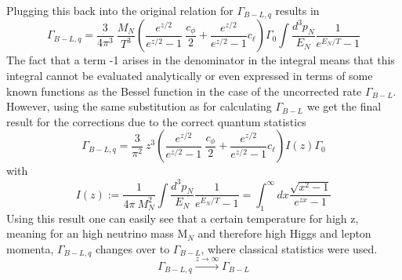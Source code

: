 Plugging this back into the original relation for $\Gamma_{B-L,q}$ results in
\begin{equation*}
\Gamma_{B-L,q}=\frac{3}{4\pi^3}\:\frac{M_N}{T^3}\left(\frac{e^{z/2}}{e^{z/2}-1}\:\frac{c_\phi}{2}+\frac{e^{z/2}}{e^{z/2}-1}c_\ell\right)\Gamma_0\int \frac{d^3p_N}{E_N}\frac{1}{e^{E_N/T}-1}
\end{equation*}
The fact that a term -1 arises in the denominator in the integral means that this integral cannot be evaluated analytically or even expressed in terms of some known functions as the Bessel function in the case of the uncorrected rate $\Gamma_{B-L}$. However, using the same substitution as for calculating $\Gamma_{B-L}$ we get the final result for the corrections due to the correct quantum statistics
\begin{equation*}
	\Gamma_{B-L,q}=\frac{3}{\pi^2}\:z^3\left(\frac{e^{z/2}}{e^{z/2}-1}\:\frac{c_\phi}{2}+\frac{e^{z/2}}{e^{z/2}-1}c_\ell\right)I(z)\Gamma_0
\end{equation*}
with 
\begin{equation*}
	I(z):=\frac{1}{4\pi\: M_N^2}\int \frac{d^3p_N}{E_N}\frac{1}{e^{E_N/T}-1}=\int_{1}^{\infty}dx\frac{\sqrt{x^2-1}}{e^{zx}-1}
\end{equation*}
Using this result one can easily see that a certain temperature for high z, meaning for an high neutrino mass M$_N$ and therefore high Higgs and lepton momenta, $\Gamma_{B-L,q}$ changes over to $\Gamma_{B-L}$, where classical statistics were used.
\begin{equation*}
	\Gamma_{B-L,q}\overset{z\rightarrow\infty}{\longrightarrow}\Gamma_{B-L}
\end{equation*}